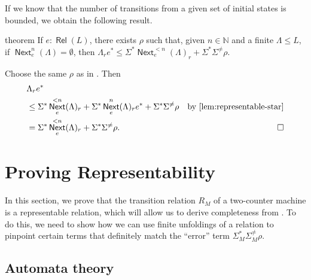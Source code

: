 \documentclass[a4paper,UKenglish,cleveref, autoref, thm-restate]{lipics-v2021}
\DeclareMathOperator{\Next}{\mathsf{Next}}
\DeclareMathOperator{\Rel}{\mathsf{Rel}}
\begin{document}
If we know that the number of transitions from a given set of initial states is
bounded, we obtain the following result.

\begin{theoremEnd}{theorem}
  \label{thm:representable-star-finite}
  If $e : \Rel(L)$, there exists $ \rho $ such that, given $n  \in  \mathbb{N}$ and a finite
  $ \Lambda   \leq  L$, if $\Next_e^n( \Lambda ) =  \emptyset $, then
  \(  \Lambda _re^*  \leq   \Sigma ^*\Next_e^{< n}( \Lambda )_r +  \Sigma ^* \Sigma ^{ \neq } \rho . \)
\end{theoremEnd}

\begin{proofEnd} %
    Choose the same $ \rho $ as in .  Then
  \begin{align*}
    &  \Lambda _re^* \\
    &  \leq   \Sigma ^*\Next_e^{<n}( \Lambda )_r +  \Sigma ^*\Next_e^n( \Lambda )_re^* +  \Sigma ^* \Sigma ^{ \neq } \rho 
    & \text{by \Cref{lem:representable-star}} \\
    & =  \Sigma ^*\Next_e^{<n}( \Lambda )_r +  \Sigma ^* \Sigma ^{ \neq } \rho . & \qedhere
  \end{align*}
\end{proofEnd}

\section{Proving Representability}
\label{sec:proving-representability}

In this section, we prove that the transition relation $R_M$ of a two-counter
machine is a representable relation, which will allow us to derive completeness
from .  To do this, we need to show how we
can use finite unfoldings of a relation to pinpoint certain terms that
definitely match the ``error'' term $ \Sigma _M^* \Sigma _M^{ \neq } \rho $.

\subsection{Automata theory}
\label{sec:automata}
\end{document}
